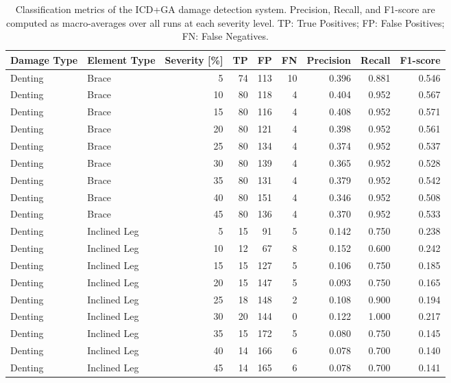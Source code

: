 \begin{table}[H]
  \centering
  \caption{Classification metrics of the ICD+GA damage detection system. Precision, Recall, and F1-score are computed as macro-averages over all runs at each severity level. TP: True Positives; FP: False Positives; FN: False Negatives.}
  \label{tab:metricas_clasificacion}
  \small
  \begin{tabular}{llrrrrrrr}
    \toprule
    Damage Type & Element Type & Severity [\%] & TP & FP & FN & Precision & Recall & F1-score \\
    \midrule
    Denting & Brace & 5 & 74 & 113 & 10 & 0.396 & 0.881 & 0.546 \\
    Denting & Brace & 10 & 80 & 118 & 4 & 0.404 & 0.952 & 0.567 \\
    Denting & Brace & 15 & 80 & 116 & 4 & 0.408 & 0.952 & 0.571 \\
    Denting & Brace & 20 & 80 & 121 & 4 & 0.398 & 0.952 & 0.561 \\
    Denting & Brace & 25 & 80 & 134 & 4 & 0.374 & 0.952 & 0.537 \\
    Denting & Brace & 30 & 80 & 139 & 4 & 0.365 & 0.952 & 0.528 \\
    Denting & Brace & 35 & 80 & 131 & 4 & 0.379 & 0.952 & 0.542 \\
    Denting & Brace & 40 & 80 & 151 & 4 & 0.346 & 0.952 & 0.508 \\
    Denting & Brace & 45 & 80 & 136 & 4 & 0.370 & 0.952 & 0.533 \\
    \cmidrule{2-9}
    Denting & Inclined Leg & 5 & 15 & 91 & 5 & 0.142 & 0.750 & 0.238 \\
    Denting & Inclined Leg & 10 & 12 & 67 & 8 & 0.152 & 0.600 & 0.242 \\
    Denting & Inclined Leg & 15 & 15 & 127 & 5 & 0.106 & 0.750 & 0.185 \\
    Denting & Inclined Leg & 20 & 15 & 147 & 5 & 0.093 & 0.750 & 0.165 \\
    Denting & Inclined Leg & 25 & 18 & 148 & 2 & 0.108 & 0.900 & 0.194 \\
    Denting & Inclined Leg & 30 & 20 & 144 & 0 & 0.122 & 1.000 & 0.217 \\
    Denting & Inclined Leg & 35 & 15 & 172 & 5 & 0.080 & 0.750 & 0.145 \\
    Denting & Inclined Leg & 40 & 14 & 166 & 6 & 0.078 & 0.700 & 0.140 \\
    Denting & Inclined Leg & 45 & 14 & 165 & 6 & 0.078 & 0.700 & 0.141 \\
    \cmidrule{2-9}

\end{tabular}
\end{table}
